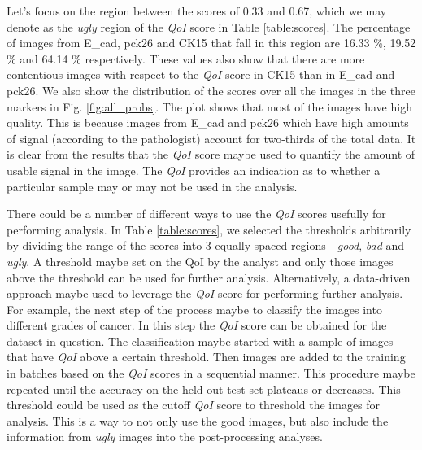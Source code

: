 Let's focus on the region between the scores of 0.33 and 0.67, which we may denote as the \textit{ugly} region of the \textit{QoI} score in Table \ref{table:scores}. The percentage of images from E\_cad, pck26 and CK15 that fall in this region are 16.33 \%, 19.52 \% and 64.14 \% respectively. These values also show that there are more contentious images  with respect to the \textit{QoI} score in CK15 than in E\_cad and pck26.
We also show  the distribution of the scores over all the images in the three markers in Fig. \ref{fig:all_probs}. The plot shows that most of the images have high quality. This is because images from E\_cad and pck26 which have high amounts of signal (according to the pathologist) account for two-thirds of the total data.
It is clear from the results that the \textit{QoI} score maybe used to quantify the amount of usable signal in the image.  The \textit{QoI}  provides an indication as to whether a particular sample may or may not be used in the analysis. 

There could be a number of different ways to use the \textit{QoI} scores usefully for performing analysis. In Table \ref{table:scores}, we selected the thresholds arbitrarily by dividing the range of the scores into 3 equally spaced regions - \textit{good}, \textit{bad} and \textit{ugly}.  A threshold maybe set on the QoI by the analyst and only those images above the threshold can be used for further analysis. Alternatively, a data-driven approach maybe used to leverage the \textit{QoI} score for performing further analysis. For example, the next step of the process maybe to classify the images into different grades of cancer.
In this step the \textit{QoI} score can be obtained for the dataset in question. The classification maybe started with a sample of images that have \textit{QoI} above a certain threshold. Then images are added to the training in batches based on the \textit{QoI} scores in a sequential manner. This procedure maybe repeated until the accuracy on the held out test set plateaus or decreases. This threshold could be used as the cutoff \textit{QoI} score to threshold the images for analysis. This is a way to not only use the good images, but also include the information from \textit{ugly} images into the post-processing analyses.

